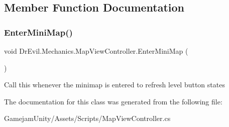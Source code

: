 \subsection{Member Function Documentation}
\mbox{\label{class_dr_evil_1_1_mechanics_1_1_map_view_controller_a1a62e396bd481e7d1b88accd03fc32f5}} 
\subsubsection{\texorpdfstring{Enter\+Mini\+Map()}{EnterMiniMap()}}
{\footnotesize\ttfamily void Dr\+Evil.\+Mechanics.\+Map\+View\+Controller.\+Enter\+Mini\+Map (\begin{DoxyParamCaption}{ }\end{DoxyParamCaption})\hspace{0.3cm}{\ttfamily [inline]}}



Call this whenever the minimap is entered to refresh level button states 



The documentation for this class was generated from the following file\+:\begin{DoxyCompactItemize}
\item 
Gamejam\+Unity/\+Assets/\+Scripts/Map\+View\+Controller.\+cs\end{DoxyCompactItemize}
